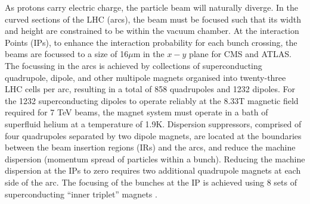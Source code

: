 As protons carry electric charge, the particle beam will naturally diverge. In the curved sections of the LHC (arcs), the beam must be focused such that its width and height are constrained to be within the vacuum chamber. At the interaction Points (IPs), to enhance the interaction probability for each bunch crossing, the beams are focussed to a size of 16$\mu$m in the $x-y$ plane for CMS and ATLAS. The focussing in the arcs is achieved by collections of superconducting quadrupole, dipole, and other multipole magnets organised into twenty-three LHC cells per arc, resulting in a total of 858 quadrupoles and 1232 dipoles. For the 1232 superconducting dipoles to operate reliably at the 8.33T magnetic field required for 7 TeV beams, the magnet system must operate in a bath of superfluid helium at a temperature of 1.9K. Dispersion suppressors, comprised of four quadrupoles separated by two dipole magnets, are located at the boundaries between the beam insertion regions (IRs) and the arcs, and reduce the machine dispersion (momentum spread of particles within a bunch). Reducing the machine dispersion at the IPs to zero requires two additional quadrupole magnets at each side of the arc. The focusing of the bunches at the IP is achieved using 8 sets of superconducting ``inner triplet'' magnets \cite{LHC:magnets1,LHC:magnets2,LHC:design}. 
%
